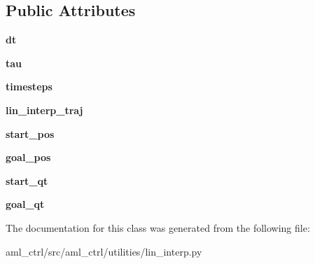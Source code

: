 \subsection*{Public Attributes}
\begin{DoxyCompactItemize}
\item 
\hypertarget{classaml__ctrl_1_1utilities_1_1lin__interp_1_1_lin_interp_a91ce8d62c538477b2e4e30cc604b9d60}{}\label{classaml__ctrl_1_1utilities_1_1lin__interp_1_1_lin_interp_a91ce8d62c538477b2e4e30cc604b9d60} 
{\bfseries dt}
\item 
\hypertarget{classaml__ctrl_1_1utilities_1_1lin__interp_1_1_lin_interp_a3a9296ff1896b9de1f43ebf138554658}{}\label{classaml__ctrl_1_1utilities_1_1lin__interp_1_1_lin_interp_a3a9296ff1896b9de1f43ebf138554658} 
{\bfseries tau}
\item 
\hypertarget{classaml__ctrl_1_1utilities_1_1lin__interp_1_1_lin_interp_a601fd091f2e367969d20dced930e84ca}{}\label{classaml__ctrl_1_1utilities_1_1lin__interp_1_1_lin_interp_a601fd091f2e367969d20dced930e84ca} 
{\bfseries timesteps}
\item 
\hypertarget{classaml__ctrl_1_1utilities_1_1lin__interp_1_1_lin_interp_a636787254c4170344140b25b54139782}{}\label{classaml__ctrl_1_1utilities_1_1lin__interp_1_1_lin_interp_a636787254c4170344140b25b54139782} 
{\bfseries lin\+\_\+interp\+\_\+traj}
\item 
\hypertarget{classaml__ctrl_1_1utilities_1_1lin__interp_1_1_lin_interp_af6583e2f56c7732af967927541ed01ce}{}\label{classaml__ctrl_1_1utilities_1_1lin__interp_1_1_lin_interp_af6583e2f56c7732af967927541ed01ce} 
{\bfseries start\+\_\+pos}
\item 
\hypertarget{classaml__ctrl_1_1utilities_1_1lin__interp_1_1_lin_interp_a2827d5e7e445519eb94643982b8fbe15}{}\label{classaml__ctrl_1_1utilities_1_1lin__interp_1_1_lin_interp_a2827d5e7e445519eb94643982b8fbe15} 
{\bfseries goal\+\_\+pos}
\item 
\hypertarget{classaml__ctrl_1_1utilities_1_1lin__interp_1_1_lin_interp_a8e59d6ea4a99b6ef7ed6a8acaac632d4}{}\label{classaml__ctrl_1_1utilities_1_1lin__interp_1_1_lin_interp_a8e59d6ea4a99b6ef7ed6a8acaac632d4} 
{\bfseries start\+\_\+qt}
\item 
\hypertarget{classaml__ctrl_1_1utilities_1_1lin__interp_1_1_lin_interp_ac042c31929df9c729e392ee7bc72a84a}{}\label{classaml__ctrl_1_1utilities_1_1lin__interp_1_1_lin_interp_ac042c31929df9c729e392ee7bc72a84a} 
{\bfseries goal\+\_\+qt}
\end{DoxyCompactItemize}


The documentation for this class was generated from the following file\+:\begin{DoxyCompactItemize}
\item 
aml\+\_\+ctrl/src/aml\+\_\+ctrl/utilities/lin\+\_\+interp.\+py\end{DoxyCompactItemize}
